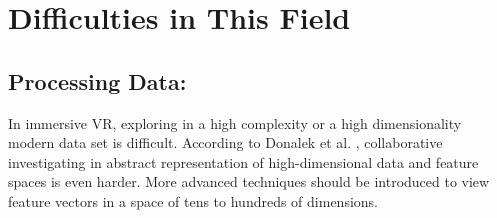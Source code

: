 \documentclass[10pt,twocolumn,letterpaper]{article}
\begin{document}






\section{Difficulties in This Field}

\subsection{Processing Data:}In immersive VR, exploring in a high complexity or a high dimensionality modern data set is difficult. According to Donalek et al. \cite{Donalek2014}, collaborative investigating in abstract representation of high-dimensional data and feature spaces is even harder. More advanced techniques should be introduced to view feature vectors in a space of tens to hundreds of dimensions.
\end{document}
